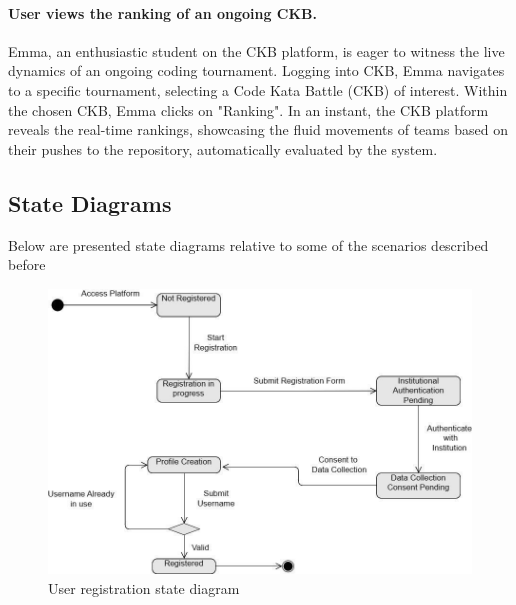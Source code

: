 \paragraph*{User views the ranking of an ongoing CKB.}
Emma, an enthusiastic student on the CKB platform, is eager to witness the live dynamics of an ongoing coding tournament.
Logging into CKB, Emma navigates to a specific tournament, selecting a Code Kata Battle (CKB) of interest.
Within the chosen CKB, Emma clicks on "Ranking". In an instant, the CKB platform reveals the real-time rankings, showcasing the fluid movements of teams based on their pushes to the repository, automatically evaluated by the system.


\subsection{State Diagrams}
\label{subsec:state_diagrams}%

Below are presented state diagrams relative to some of the scenarios described before

\begin{figure}[H]
    \begin{center}
        \includegraphics[width=0.9\linewidth]{Images/user-registration.jpg}
        \caption{User registration state diagram}
        \label{fig:state_diagram_1}%
    \end{center}
\end{figure}

